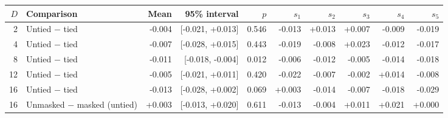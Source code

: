 \begin{tabular}{rlrrrrrrrr}
\toprule
$D$ & Comparison & Mean & 95\% interval & $p$ & $s_1$ & $s_2$ & $s_3$ & $s_4$ & $s_5$ \\
\midrule
2 & Untied $-$ tied & -0.004 & [-0.021, +0.013] & 0.546 & -0.013 & +0.013 & +0.007 & -0.009 & -0.019 \\
4 & Untied $-$ tied & -0.007 & [-0.028, +0.015] & 0.443 & -0.019 & -0.008 & +0.023 & -0.012 & -0.017 \\
8 & Untied $-$ tied & -0.011 & [-0.018, -0.004] & 0.012 & -0.006 & -0.012 & -0.005 & -0.014 & -0.018 \\
12 & Untied $-$ tied & -0.005 & [-0.021, +0.011] & 0.420 & -0.022 & -0.007 & -0.002 & +0.014 & -0.008 \\
16 & Untied $-$ tied & -0.013 & [-0.028, +0.002] & 0.069 & +0.003 & -0.014 & -0.007 & -0.018 & -0.029 \\
16 & Unmasked $-$ masked (untied) & +0.003 & [-0.013, +0.020] & 0.611 & -0.013 & -0.004 & +0.011 & +0.021 & +0.000 \\
\bottomrule
\end{tabular}
